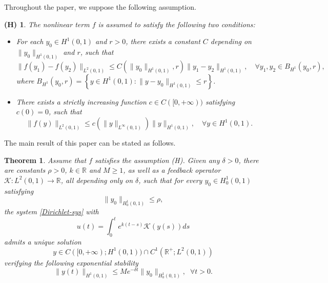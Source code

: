 \documentclass[review]{elsarticle}
\newtheorem{theorem}{Theorem}[section]
\newtheorem*{assumption}{(H)}
\numberwithin{equation}{section}
\begin{document}




Throughout the paper, we suppose the following assumption.
\begin{assumption}
\label{a1}
 The nonlinear term $f$ is assumed to satisfy the following two conditions:
\begin{itemize}
    \item[(i)] For each $y_0 \in H^1(0,1)$ and $r>0$, there exists a constant $C$ depending on $\|y_0\|_{H^1(0,1)}$ and $r$, such that  $$\|f(y_1)-f(y_2)\|_{L^2(0,1)}\le C(\|y_0\|_{H^1(0,1)},r) \|y_1-y_2\|_{H^1(0,1)},\quad \forall y_1,y_2\in B_{{H^1}}(y_0,r),$$
    where $B_{{H^1}}(y_0,r)=\left\{ y\in H^1(0,1):\|y-y_0\|_{H^1(0,1)}\le r\right\} $.
    \item[(ii)] There exists a strictly increasing function  
$c\in C([0,+\infty))$  satisfying $c(0) = 0$, such that 
$$  
\|f(y)\|_{L^2(0,1)} \leq c(\|y\|_{L^\infty(0,1)}) \|y\|_{H^1(0,1)},\quad \forall y \in H^1(0,1).  
$$  
\end{itemize}
    
\end{assumption}


The main result of this paper can be stated as follows.
\begin{theorem}
     \label{main-th1}
      Assume that $f$ satisfies the assumption (H). Given any $\delta>0$, 
      there are constants $\rho>0$, $k\in \mathbb{R}$ and $M\ge 1$, as well as a {feedback operator $\mathcal{K}:L^2(0,1)\to \mathbb{R}$}, all depending only on $\delta$, such that for every $y_0\in H^1_0(0,1)$ satisfying
         \begin{equation*}
             \|y_0\|_{H^1_0(0,1)}\le \rho,
         \end{equation*}
        the system \eqref{Dirichlet-sys} with {\begin{equation}
            \label{U-MAIN}u(t)=\int_0^t e^{k(t-s)}\mathcal{K}(y(s))ds
        \end{equation}}admits a unique solution $$y\in C([0,+\infty);H^1(0,1))\cap 
 C^1(\mathbb{R}^+;L^2(0,1))  $$ verifying the following exponential stability
         \begin{equation}
         \label{exp-s}
             \|y(t)\|_{H^1(0,1)}\le Me^{-\delta t}\|y_0\|_{H^1_0(0,1)},\;\;\forall t>0.
         \end{equation}
 \end{theorem}
 
\end{document}
